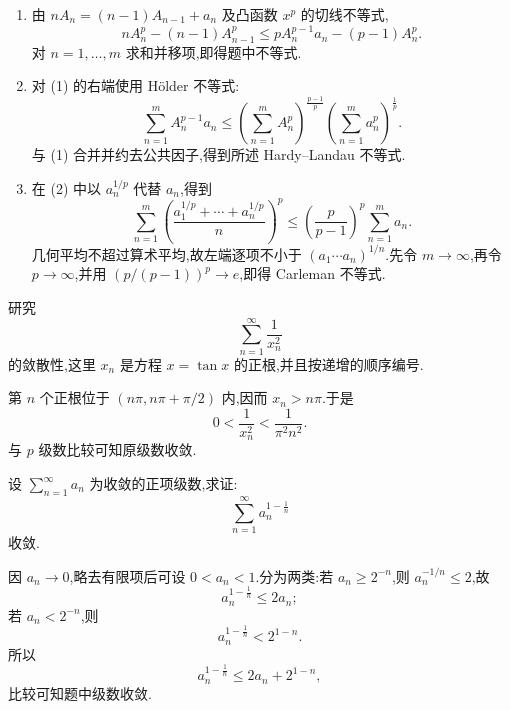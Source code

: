 \begin{solution}
    \leavevmode
    \begin{enumerate}
        \item 由 $nA_n=(n-1)A_{n-1}+a_n$ 及凸函数 $x^p$ 的切线不等式,
              \[
                  nA_n^p-(n-1)A_{n-1}^p
                  \leq pA_n^{p-1}a_n-(p-1)A_n^p.
              \]
              对 $n=1,\ldots,m$ 求和并移项,即得题中不等式.
        \item 对 (1) 的右端使用 H\"older 不等式:
              \[
                  \displaystyle\sum\limits_{n=1}^{m}A_n^{p-1}a_n
                  \leq
                  \left(\sum\limits_{n=1}^{m}A_n^p\right)^{\frac{p-1}{p}}
                  \left(\sum\limits_{n=1}^{m}a_n^p\right)^{\frac{1}{p}}.
              \]
              与 (1) 合并并约去公共因子,得到所述 Hardy--Landau 不等式.
        \item 在 (2) 中以 $a_n^{1/p}$ 代替 $a_n$,得到
              \[
                  \displaystyle\sum\limits_{n=1}^{m}
                  \left(\dfrac{a_1^{1/p}+\cdots+a_n^{1/p}}n\right)^p
                  \leq\left(\dfrac{p}{p-1}\right)^p\sum\limits_{n=1}^{m}a_n.
              \]
              几何平均不超过算术平均,故左端逐项不小于
              $(a_1\cdots a_n)^{1/n}$.先令 $m\to\infty$,再令 $p\to\infty$,并用
              $(p/(p-1))^p\to e$,即得 Carleman 不等式.
    \end{enumerate}
\end{solution}

\begin{example}
    研究
    \[
        \displaystyle\sum\limits_{n=1}^{\infty}\dfrac{1}{x_n^2}
    \]
    的敛散性,这里 $x_n$ 是方程 $x=\tan x$ 的正根,并且按递增的顺序编号.
\end{example}
\exampleblank

\begin{solution}
    第 $n$ 个正根位于 $(n\pi,n\pi+\pi/2)$ 内,因而 $x_n>n\pi$.于是
    \[
        0<\dfrac{1}{x_n^2}<\dfrac{1}{\pi^2n^2}.
    \]
    与 $p$ 级数比较可知原级数收敛.
\end{solution}

\begin{example}
    设 $\displaystyle\sum\limits_{n=1}^{\infty}a_n$ 为收敛的正项级数,求证:
    \[
        \displaystyle\sum\limits_{n=1}^{\infty}a_n^{1-\frac{1}{n}}
    \]
    收敛.
\end{example}
\exampleblank

\begin{solution}
    因 $a_n\to0$,略去有限项后可设 $0<a_n<1$.分为两类:若
    $a_n\geq2^{-n}$,则 $a_n^{-1/n}\leq2$,故
    \[
        a_n^{1-\frac{1}{n}}\leq2a_n;
    \]
    若 $a_n<2^{-n}$,则
    \[
        a_n^{1-\frac{1}{n}}<2^{1-n}.
    \]
    所以
    \[
        a_n^{1-\frac{1}{n}}\leq2a_n+2^{1-n},
    \]
    比较可知题中级数收敛.
\end{solution}

